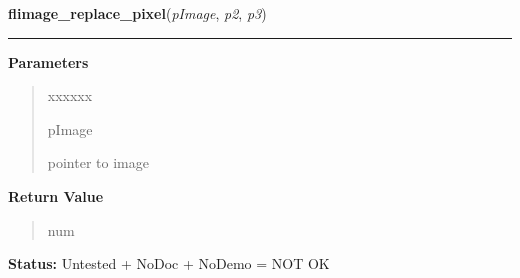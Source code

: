 \hspace{.8\funcindent}\begin{boxedminipage}{\funcwidth}

    \raggedright \textbf{flimage\_replace\_pixel}(\textit{pImage}, \textit{p2}, \textit{p3})

    \vspace{-1.5ex}

    \rule{\textwidth}{0.5\fboxrule}
\setlength{\parskip}{2ex}
\setlength{\parskip}{1ex}
      \textbf{Parameters}
      \vspace{-1ex}

      \begin{quote}
        \begin{Ventry}{xxxxxx}

          \item[pImage]

          pointer to image

        \end{Ventry}

      \end{quote}

      \textbf{Return Value}
    \vspace{-1ex}

      \begin{quote}
      num

      \end{quote}

\textbf{Status:} Untested + NoDoc + NoDemo = NOT OK



    \end{boxedminipage}

    \label{xformslib:library:flimage_transform_pixels}

    \vspace{0.5ex}


